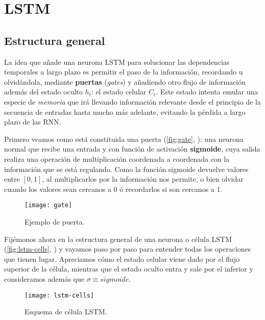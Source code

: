 \section{LSTM}

\subsection{Estructura general}

La idea que añade una neurona LSTM para solucionar las dependencias temporales a largo plazo es permitir el paso de la información, recordando u olvidándola, mediante \textbf{puertas} (\emph{gates}) y añadiendo otro flujo de información además del estado oculto $h_t$: el estado celular $C_t$. Este estado intenta emular una especie de \emph{memoria} que irá llevando información relevante desde el principio de la secuencia de entradas hasta mucho más adelante, evitando la pérdida a largo plazo de las RNN.

Primero veamos como está constituida una puerta (\autoref{fig:gate}, \cite{christopher2015lstm}): una neurona normal que recibe una entrada y con función de activación \textbf{sigmoide}, cuya salida realiza una operación de multiplicación coordenada a coordenada con la información que se está regulando. Como la función sigmoide devuelve valores entre $[0, 1]$, al multiplicarlos por la información nos permite, o bien olvidar cuando los valores sean cercanos a 0 ó recordarlos si son cercanos a 1.

\begin{figure}[htpb]
  \centering
  \texttt{[image: gate]}
  \caption{Ejemplo de puerta.}
  \label{fig:gate}
\end{figure}

Fijémonos ahora en la estructura general de una neurona o célula LSTM (\autoref{fig:lstm-cells}, \cite{christopher2015lstm}) y vayamos paso por paso para entender todas los operaciones que tienen lugar. Apreciamos cómo el estado celular viene dado por el flujo superior de la célula, mientras que el estado oculto entra y sale por el inferior y consideramos además que $\sigma \equiv sigmoide$.

\begin{figure}[htpb]
  \centering
  \texttt{[image: lstm-cells]}
  \caption{Esquema de célula LSTM.}
  \label{fig:lstm-cells}
\end{figure}

